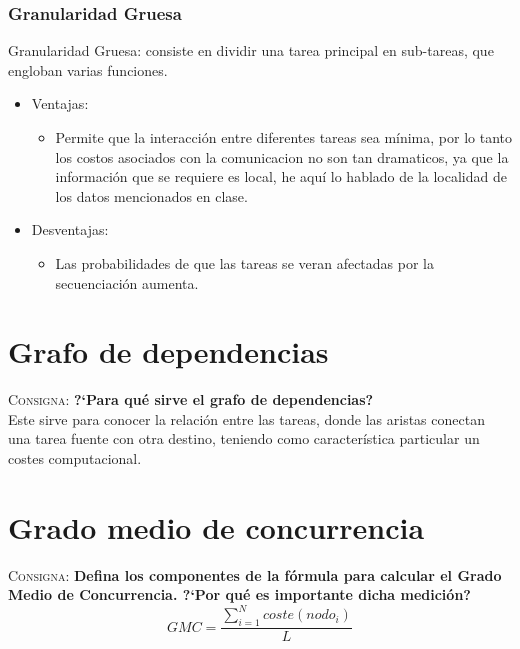 \documentclass{article}
\begin{document}
\subsubsection{Granularidad Gruesa}
Granularidad Gruesa: consiste en dividir una tarea principal en sub-tareas, que
engloban varias funciones.
\begin{itemize}
\item Ventajas:
	\begin{itemize}
	\item Permite que la interacci\'on entre diferentes tareas sea m\'inima, por
lo tanto los costos asociados con la comunicacion no son tan dramaticos, ya que
la informaci\'on que se requiere es local, he aqu\'i lo hablado de la localidad
de los datos mencionados en clase.
	\end{itemize}
\item Desventajas:
	\begin{itemize}
	\item Las probabilidades de que las tareas se veran afectadas por la
secuenciaci\'on aumenta.
	\end{itemize}
\end{itemize}

\section{Grafo de dependencias}
\textsc{Consigna}: \textbf{?`Para qu\'e sirve el grafo de dependencias?}\\

Este sirve para conocer la relación entre las tareas, donde las aristas
conectan una tarea fuente con otra destino, teniendo como característica
particular un costes computacional.

\section{Grado medio de concurrencia}
\textsc{Consigna}: \textbf{Defina los componentes de la f\'ormula para calcular
el Grado Medio de Concurrencia. ?`Por qu\'e es importante dicha medici\'on?}\\

\begin{equation}
	GMC=\frac{\sum_{i=1}^{N} coste(nodo_{i})}{L}
\end{equation}
\end{document}
